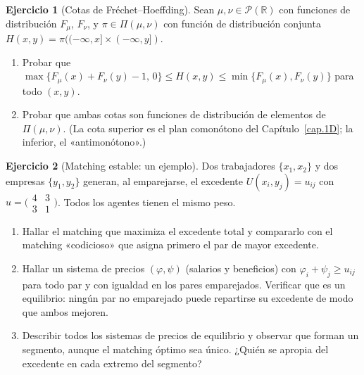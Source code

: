 \documentclass[12pt, a4paper]{amsbook}
\newcommand{\R}{{\mathbb R}}
\theoremstyle{remark}
\theoremstyle{definition}
\newtheorem{ejercicio}{Ejercicio}[chapter]
\numberwithin{section}{chapter}
\numberwithin{subsection}{section}
\numberwithin{equation}{section}
\numberwithin{figure}{chapter}
\begin{document}
\begin{ejercicio}[Cotas de Fréchet--Hoeffding]\label{ejer.frechet.hoeffding}
Sean $\mu,\nu\in\mathcal P(\R)$ con funciones de distribución $F_\mu$, $F_\nu$,
y $\pi\in\Pi(\mu,\nu)$ con función de distribución conjunta
$H(x,y)=\pi((-\infty,x]\times(-\infty,y])$.
\begin{enumerate}[label=(\alph*)]
\item Probar que
$\max\{F_\mu(x)+F_\nu(y)-1,\,0\}\le H(x,y)\le\min\{F_\mu(x),F_\nu(y)\}$
para todo $(x,y)$.
\item Probar que ambas cotas son funciones de distribución de elementos de
$\Pi(\mu,\nu)$. (La cota superior es el plan comonótono del
Capítulo~\ref{cap.1D}; la inferior, el «antimonótono».)
\end{enumerate}
\end{ejercicio}

\begin{ejercicio}[Matching estable: un ejemplo]\label{ejer.matching.ejemplo}
Dos trabajadores $\{x_1,x_2\}$ y dos empresas $\{y_1,y_2\}$ generan, al
emparejarse, el excedente $U(x_i,y_j)=u_{ij}$ con
$u=\bigl(\begin{smallmatrix}4&3\\3&1\end{smallmatrix}\bigr)$. Todos los
agentes tienen el mismo peso.
\begin{enumerate}[label=(\alph*)]
\item Hallar el matching que maximiza el excedente total y compararlo con
el matching «codicioso» que asigna primero el par de mayor excedente.
\item Hallar un sistema de precios $(\varphi,\psi)$ (salarios y beneficios)
con $\varphi_i+\psi_j\ge u_{ij}$ para todo par y con igualdad en los pares
emparejados. Verificar que es un equilibrio: ningún par no emparejado puede
repartirse su excedente de modo que ambos mejoren.
\item Describir todos los sistemas de precios de equilibrio y observar que
forman un segmento, aunque el matching óptimo sea único. ¿Quién se apropia
del excedente en cada extremo del segmento?
\end{enumerate}
\end{ejercicio}
\end{document}
